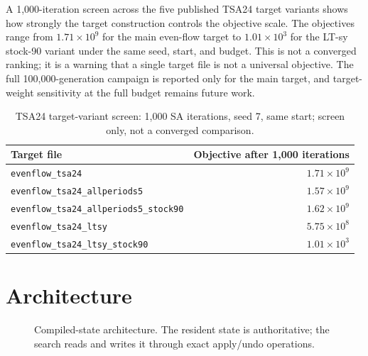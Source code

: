 \documentclass[11pt]{article}
\begin{document}
A 1,000-iteration screen across the five published TSA24 target variants shows how strongly the target
construction controls the objective scale. The objectives range from $1.71\times10^9$ for the main even-flow
target to $1.01\times10^3$ for the LT-sy stock-90 variant under the same seed, start, and budget. This is not a
converged ranking; it is a warning that a single target file is not a universal objective. The full
100,000-generation campaign is reported only for the main target, and target-weight sensitivity at the
full budget remains future work.

\begin{table}[t]
\centering
\caption{TSA24 target-variant screen: 1,000 SA iterations, seed 7, same start; screen only, not a
converged comparison.}
\label{tab:target-screen}
\small
\begin{tabular}{lr}
\toprule
Target file & Objective after 1,000 iterations \\
\midrule
\texttt{evenflow\_tsa24} & $1.71\times10^{9}$ \\
\texttt{evenflow\_tsa24\_allperiods5} & $1.57\times10^{9}$ \\
\texttt{evenflow\_tsa24\_allperiods5\_stock90} & $1.62\times10^{9}$ \\
\texttt{evenflow\_tsa24\_ltsy} & $5.75\times10^{8}$ \\
\texttt{evenflow\_tsa24\_ltsy\_stock90} & $1.01\times10^{3}$ \\
\bottomrule
\end{tabular}
\end{table}

\section{Architecture}\label{architecture}

\begin{figure}[t]
\centering
{}
\caption{Compiled-state architecture. The resident state is authoritative; the search reads and writes it through exact apply/undo operations.}
\label{fig:architecture}
\end{figure}
\end{document}
